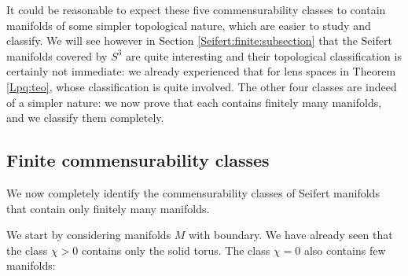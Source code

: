 It could be reasonable to expect these five commensurability classes to contain manifolds of some simpler topological nature, which are easier to study and classify. We will see however in Section \ref{Seifert:finite:subsection} that the Seifert manifolds covered by $S^3$ are quite interesting and their topological classification is certainly not immediate: we already experienced that for lens spaces in Theorem \ref{Lpq:teo}, whose classification is quite involved. The other four classes are indeed of a simpler nature: we now prove that each contains finitely many manifolds, and we classify them completely.

\subsection{Finite commensurability classes} \label{finite:classes:prop}
We now completely identify the commensurability classes of Seifert manifolds that contain only finitely many manifolds.

We start by considering manifolds $M$ with boundary. We have already seen that the class $\chi>0$ contains only the solid torus. The class $\chi=0$ also contains few manifolds:

